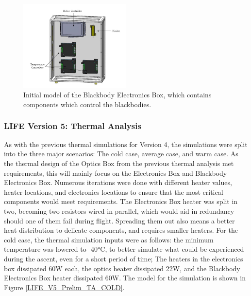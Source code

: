 \begin{figure}
    \centering
    \includegraphics[width=0.5\textwidth]{chap3_images/LIFE_V5_initial_images/BBEbox_V1_init_labelled.JPG}
    \caption{Initial model of the Blackbody Electronics Box, which contains components which control the blackbodies.}
    \label{fig:BBEBOX_PRELIM}
\end{figure}

\subsubsection{LIFE Version 5: Thermal Analysis}
As with the previous thermal simulations for Version 4, the simulations were split into the three major scenarios: The cold case, average case, and warm case. As the thermal design of the Optics Box from the previous thermal analysis met requirements, this will mainly focus on the Electronics Box and Blackbody Electronics Box. Numerous iterations were done with different heater values, heater locations, and electronics locations to ensure that the most critical components would meet requirements. The Electronics Box heater was split in two, becoming two resistors wired in parallel, which would aid in redundancy should one of them fail during flight. Spreading them out also means a better heat distribution to delicate components, and requires smaller heaters. For the cold case, the thermal simulation inputs were as follows: the minimum temperature was lowered to -40°C, to better simulate what could be experienced during the ascent, even for a short period of time; The heaters in the electronics box dissipated 60W each, the optics heater dissipated 22W, and the Blackbody Electronics Box heater dissipated 60W. The model for the simulation is shown in Figure \ref{LIFE_V5_Prelim_TA_COLD}.

